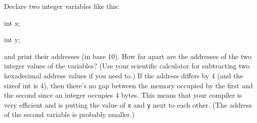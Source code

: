 Declare two integer variables like this:

\begin{consolethree}[escapeinside=||]

int x;

int y;

\end{consolethree}

and print their addresses (in base 10). How far apart are the addresses of the two integer values of the variables? (Use your scientific calculator for subtracting two hexadecimal address values if you need to.) If the address differs by 4 (and the sizeof int is 4), then there's no gap between the memory occupied by the first and the second since an integer occupies 4 bytes. This means that your compiler is very efficient and is putting the value of \texttt{x} and \texttt{y} next to each other. (The address of the second variable is probably smaller.)

